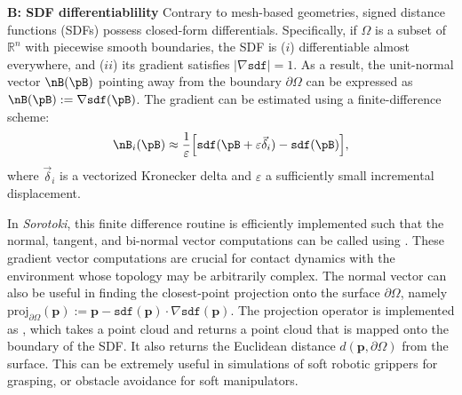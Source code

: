 \textbf{B: SDF differentiablility}
Contrary to mesh-based geometries, signed distance functions (SDFs) possess closed-form differentials. Specifically, if $\Omega$ is a subset of $\mathbb{R}^n$ with piecewise smooth boundaries, the SDF is ($i$) differentiable almost everywhere, and ($ii$) its gradient satisfies $|\nabla \texttt{sdf}| = 1$. As a result, the unit-normal vector $\nB(\pB)$ pointing away from the boundary $\partial \Omega$ can be expressed as $\nB(\pB):= \nabla \texttt{sdf}(\pB)$. The gradient can be estimated using a finite-difference scheme:
%
\begin{align}
    \nB_{i}(\pB) \approx \frac{1}{\varepsilon} \Big[\texttt{sdf}(\pB + \varepsilon \vec{\delta}_{i}) - \texttt{sdf}(\pB) \Big],
\end{align}
%
where $\vec{\delta}_{i}$ is a vectorized Kronecker delta and $\varepsilon$ a sufficiently small incremental displacement. 

In \textit{Sorotoki}, this finite difference routine is efficiently implemented such that the normal, tangent, and bi-normal vector computations can be called using . These gradient vector computations are crucial for contact dynamics with the environment whose topology may be arbitrarily complex. The normal vector can also be useful in finding the closest-point projection onto the surface $\partial \Omega$, namely $\textrm{proj}_{\partial \Omega}(\mathbf{p}):= \mathbf{p} - \texttt{sdf}(\mathbf{p}) \cdot \nabla \texttt{sdf}(\mathbf{p})$. The projection operator is implemented as , which takes a point cloud  and returns a point cloud  that is mapped onto the boundary of the SDF. It also returns the Euclidean distance $d(\mathbf{p},\partial \Omega)$ from the surface. This can be extremely useful in simulations of soft robotic grippers for grasping, or obstacle avoidance for soft manipulators.